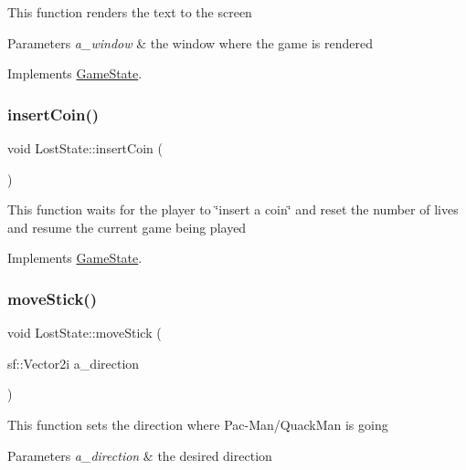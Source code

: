 This function renders the text to the screen


\begin{DoxyParams}{Parameters}
{\em a\+\_\+window} & the window where the game is rendered \\
\hline
\end{DoxyParams}


Implements \hyperlink{class_game_state_a5ffd5ce9acb7499ddef613e8836d1ef8}{Game\+State}.

\mbox{\label{class_lost_state_aa35179942033d9ab54fbcd7122f40497}} 
\subsubsection{\texorpdfstring{insert\+Coin()}{insertCoin()}}
{\footnotesize\ttfamily void Lost\+State\+::insert\+Coin (\begin{DoxyParamCaption}{ }\end{DoxyParamCaption})\hspace{0.3cm}{\ttfamily [virtual]}}

This function waits for the player to \char`\"{}insert a coin\char`\"{} and reset the number of lives and resume the current game being played 

Implements \hyperlink{class_game_state_a4cd6f5b4ad23fc08dca287df26d94b94}{Game\+State}.

\mbox{\label{class_lost_state_abc978a14604451eee5e0373b4ad374c8}} 
\subsubsection{\texorpdfstring{move\+Stick()}{moveStick()}}
{\footnotesize\ttfamily void Lost\+State\+::move\+Stick (\begin{DoxyParamCaption}\item[{sf\+::\+Vector2i}]{a\+\_\+direction }\end{DoxyParamCaption})\hspace{0.3cm}{\ttfamily [virtual]}}

This function sets the direction where Pac-\/\+Man/\+Quack\+Man is going


\begin{DoxyParams}{Parameters}
{\em a\+\_\+direction} & the desired direction \\
\hline
\end{DoxyParams}


